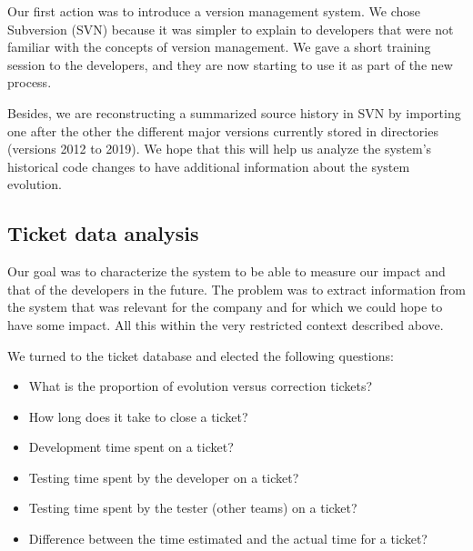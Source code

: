 \documentclass[10pt,conference]{IEEEtran}
\begin{document}
Our first action was to introduce a version management system.
We chose Subversion (SVN) because it was simpler to explain to developers that were not familiar with the concepts of version management.
We gave a short training session to the developers, and they are now starting to use it as part of the new process.

Besides, we are reconstructing a summarized source history in SVN by importing one after the other the different major versions currently stored in directories (versions 2012 to 2019). 
We hope that this will help us analyze the system's historical code changes to have additional information about the system evolution.

\subsection{Ticket data analysis}

Our goal was to characterize the system to be able to measure our impact and that of the developers in the future.
The problem was to extract information from the system that was relevant for the company and for which we could hope to have some impact.
All this within the very restricted context described above.


We turned to the ticket database and elected the following questions:
\begin{itemize}
 \item What is the proportion of evolution versus correction tickets?
 \item How long does it take to close a ticket?
 \item Development time spent on a ticket?
 \item Testing time spent by the developer on a ticket?
 \item Testing time spent by the tester (other teams) on a ticket?
 \item Difference between the time estimated and the actual time for a ticket?
 \end{itemize}
 
\end{document}
